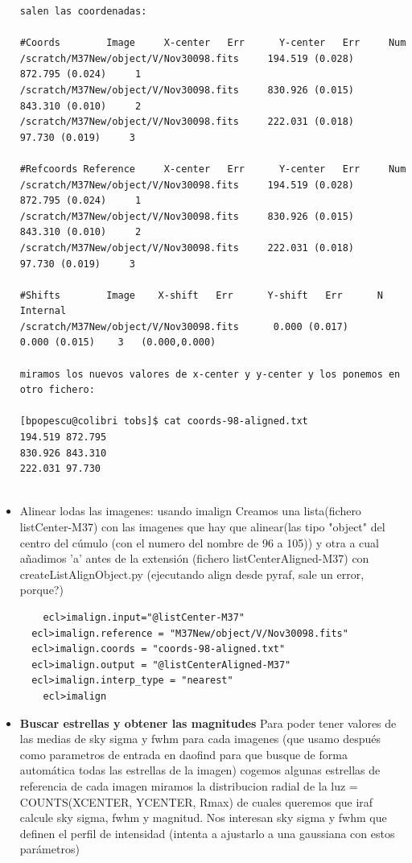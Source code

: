 \documentclass{article}
\begin{document}
\begin{itemize}
\begin{verbatim}
salen las coordenadas:

#Coords        Image     X-center   Err      Y-center   Err     Num
/scratch/M37New/object/V/Nov30098.fits     194.519 (0.028)     872.795 (0.024)     1
/scratch/M37New/object/V/Nov30098.fits     830.926 (0.015)     843.310 (0.010)     2
/scratch/M37New/object/V/Nov30098.fits     222.031 (0.018)      97.730 (0.019)     3

#Refcoords Reference     X-center   Err      Y-center   Err     Num
/scratch/M37New/object/V/Nov30098.fits     194.519 (0.028)     872.795 (0.024)     1
/scratch/M37New/object/V/Nov30098.fits     830.926 (0.015)     843.310 (0.010)     2
/scratch/M37New/object/V/Nov30098.fits     222.031 (0.018)      97.730 (0.019)     3

#Shifts        Image    X-shift   Err      Y-shift   Err      N      Internal
/scratch/M37New/object/V/Nov30098.fits      0.000 (0.017)      0.000 (0.015)    3   (0.000,0.000)

miramos los nuevos valores de x-center y y-center y los ponemos en otro fichero:

[bpopescu@colibri tobs]$ cat coords-98-aligned.txt 
194.519 872.795
830.926 843.310
222.031 97.730


\end{verbatim}

\item Alinear lodas las imagenes: usando imalign
Creamos una lista(fichero listCenter-M37) con las imagenes  que hay que alinear(las tipo "object" del centro del cúmulo (con el numero del nombre  de 96 a 105)) y otra a cual añadimos 'a' antes de la extensión (fichero listCenterAligned-M37) con createListAlignObject.py (ejecutando align desde pyraf, sale un error, porque?)

\begin{verbatim}
 	ecl>imalign.input="@listCenter-M37"   
  ecl>imalign.reference = "M37New/object/V/Nov30098.fits" 
  ecl>imalign.coords = "coords-98-aligned.txt" 
  ecl>imalign.output = "@listCenterAligned-M37" 
  ecl>imalign.interp_type = "nearest" 
	ecl>imalign
\end{verbatim}

\item  \textbf{Buscar estrellas y obtener las magnitudes}
Para poder tener valores de las medias de sky sigma y fwhm para cada imagenes (que usamo después como parametros de entrada en daofind para que busque de forma automática todas las estrellas de la imagen) cogemos algunas estrellas de referencia de  cada imagen miramos la distribucion radial de la luz = COUNTS(XCENTER, YCENTER, Rmax) de cuales queremos que iraf calcule sky sigma, fwhm y magnitud. Nos interesan sky sigma y fwhm que definen el perfil de intensidad (intenta a ajustarlo a una gaussiana con estos parámetros)


\end{itemize}
\end{document}
